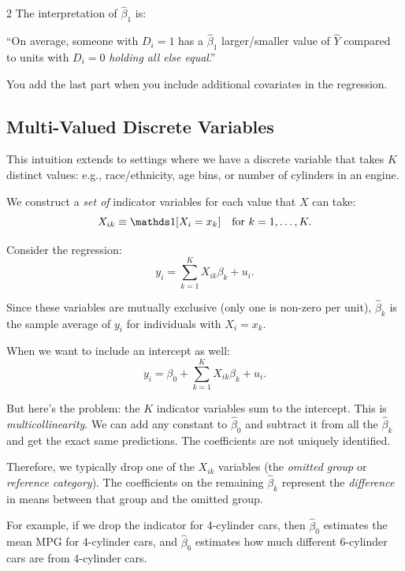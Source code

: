 \documentclass[12pt]{article}
\begin{document}
\begin{multicols}{2}
  The interpretation of $\hat{\beta}_1$ is:

    ``On average, someone with $D_i = 1$ has a $\hat{\beta}_1$ larger/smaller value of $\hat{Y}$ compared to units with $D_i = 0$ \emph{holding all else equal}.''

  You add the last part when you include additional covariates in the regression.

  \subsection*{Multi-Valued Discrete Variables}

  This intuition extends to settings where we have a discrete variable that takes $K$ distinct values: e.g., race/ethnicity, age bins, or number of cylinders in an engine.

  We construct a \emph{set of} indicator variables for each value that $X$ can take:
  $$X_{ik} \equiv \one{X_i = x_k} \quad \text{for } k = 1, \dots, K.$$

  Consider the regression:
  $$y_i = \sum_{k=1}^K X_{ik} \beta_k + u_i.$$

  Since these variables are mutually exclusive (only one is non-zero per unit), $\hat{\beta}_k$ is the sample average of $y_i$ for individuals with $X_i = x_k$.

  When we want to include an intercept as well:
  $$y_i = \beta_0 + \sum_{k=1}^K X_{ik} \beta_k + u_i.$$

  But here's the problem: the $K$ indicator variables sum to the intercept. This is \emph{multicollinearity}. We can add any constant to $\hat{\beta}_0$ and subtract it from all the $\hat{\beta}_k$ and get the exact same predictions. The coefficients are not uniquely identified.

  Therefore, we typically drop one of the $X_{ik}$ variables (the \emph{omitted group} or \emph{reference category}). The coefficients on the remaining $\hat{\beta}_k$ represent the \emph{difference} in means between that group and the omitted group.

  For example, if we drop the indicator for 4-cylinder cars, then $\hat{\beta}_0$ estimates the mean MPG for 4-cylinder cars, and $\hat{\beta}_6$ estimates how much different 6-cylinder cars are from 4-cylinder cars.


\end{multicols}
\end{document}
